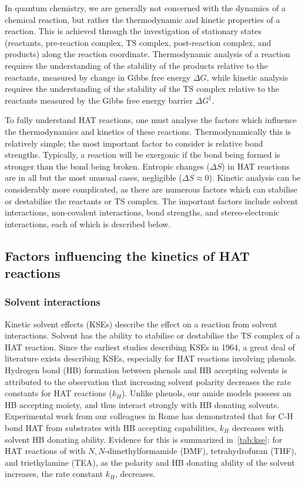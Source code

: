 In quantum chemistry, we are generally not concerned with the dynamics of a
chemical reaction, but rather the thermodynamic and kinetic properties of a
reaction. This is achieved through the investigation of stationary states
(reactants, pre-reaction complex, TS complex, post-reaction complex, and
products) along the reaction coordinate. Thermodynamic analysis of a reaction
requires the understanding of the stability of the products relative to the
reactants, measured by change in Gibbs free energy $\Delta G$, while kinetic
analysis requires the understanding of the stability of the TS complex relative
to the reactants measured by the Gibbs free energy
barrier $\Delta G^{\ddagger}$.

To fully understand HAT reactions, one must analyse the factors which influence
the thermodynamics and kinetics of these reactions. Thermodynamically this is
relatively simple; the most important factor to consider is relative bond
strengths. Typically, a reaction will be exergonic if the bond being formed is
stronger than the bond being broken. Entropic changes ($\Delta S$) in HAT
reactions are in all but the most unusual cases, negligible
($\Delta S \approx 0$).\cite{Mader2007} Kinetic analysis can be considerably
more complicated, as there are numerous factors which can stabilise or
destabilise the reactants or TS complex. The important factors include solvent
interactions, non-covalent interactions, bond strengths, and stereo-electronic
interactions, each of which is described below.

\subsection{Factors influencing the kinetics of HAT reactions}

\subsubsection{Solvent interactions}

Kinetic solvent effects (KSEs) describe the effect on a reaction from solvent
interactions. Solvent has the ability to stabilise or destabilise the TS complex
of a HAT reaction. Since the earliest studies describing KSEs in
1964,\cite{Howard1964} a great deal of literature exists describing KSEs,
especially for HAT reactions involving phenols.\cite{note2} Hydrogen bond (HB)
formation between phenols and HB accepting solvents is attributed to the
observation that increasing solvent polarity decreases the rate constants for
HAT reactions ($k_H$). Unlike phenols, our amide models possess an HB accepting
moiety, and thus interact strongly with HB donating solvents. Experimental work
from our colleagues in Rome has demonstrated that for C-H bond HAT from
substrates with HB accepting capabilities, $k_H$ decreases with solvent HB
donating ability. Evidence for this is summarized in~\ref{tab:kse}: for HAT
reactions of \cumo with $N,N$-dimethylformamide (DMF), tetrahydrofuran (THF),
and triethylamine (TEA), as the polarity and HB donating ability of the solvent
increases, the rate constant $k_H$, decreases.


